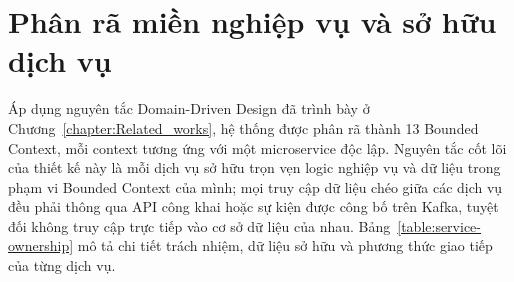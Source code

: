 \documentclass[../DoAn.tex]{subfiles}
\begin{document}
{%

\section{Phân rã miền nghiệp vụ và sở hữu dịch vụ}
\label{section:4.4}

Áp dụng nguyên tắc Domain-Driven Design đã trình bày ở Chương~\ref{chapter:Related_works}, hệ
thống được phân rã thành 13 Bounded Context, mỗi context tương ứng với một microservice độc
lập. Nguyên tắc cốt lõi của thiết kế này là mỗi dịch vụ sở hữu trọn vẹn logic nghiệp vụ và dữ
liệu trong phạm vi Bounded Context của mình; mọi truy cập dữ liệu chéo giữa các dịch vụ đều
phải thông qua API công khai hoặc sự kiện được công bố trên Kafka, tuyệt đối không truy cập
trực tiếp vào cơ sở dữ liệu của nhau. Bảng~\ref{table:service-ownership} mô tả chi tiết trách
nhiệm, dữ liệu sở hữu và phương thức giao tiếp của từng dịch vụ.

}
\end{document}
